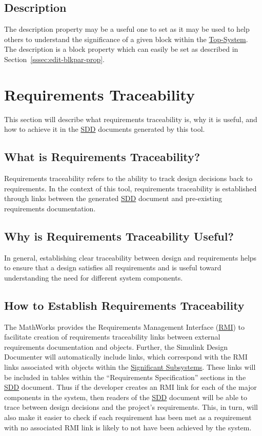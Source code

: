 \documentclass{mcscert}
\newcommand{\mathworks}{The MathWorks}
\newcommand{\sddtool}{Simulink Design Documenter}
\newcommand{\topsystemnolink}{Top-System} %
\newcommand{\topsystem}{\hyperref[def:topsystem]{\topsystemnolink{}}}
\newcommand{\sigsubsnolink}{Significant Subsystems} %
\newcommand{\sigsubs}{\hyperref[def:sigsubs]{\sigsubsnolink{}}}
\begin{document}
	\subsection{Description}
	\label{ssec:include-int-descr}
	The description property may be a useful one to set as it may be used to help others to understand the significance of a given block within the \topsystem{}. The description is a block property which can easily be set as described in Section~\ref{sssec:edit-blkpar-prop}.

\section{Requirements Traceability}
\label{sec:req-trace}
This section will describe what requirements traceability is, why it is useful, and how to achieve it in the \hyperref[acr:sdd]{SDD} documents generated by this tool. 
		
	\subsection{What is Requirements Traceability?}
	Requirements traceability refers to the ability to track design decisions back to requirements. 
	In the context of this tool, requirements traceability is established through links between the generated \hyperref[acr:sdd]{SDD} document and pre-existing requirements documentation.
	  
	\subsection{Why is Requirements Traceability Useful?}
	In general, establishing clear traceability between design and requirements helps to ensure that a design satisfies all requirements and is useful toward understanding the need for different system components.

	\subsection{How to Establish Requirements Traceability}
	\mathworks{} provides the Requirements Management Interface (\hyperref[acr:rmi]{RMI}) to facilitate creation of requirements traceability links between external requirements documentation and \simulink{} objects. 
	Further, the \sddtool{} will automatically include links, which correspond with the RMI links associated with objects within the \sigsubs{}. 
	These links will be included in tables within the ``Requirements Specification'' sections in the \hyperref[acr:sdd]{SDD} document. 
	Thus if the developer creates an RMI link for each of the major components in the system, then readers of the \hyperref[acr:sdd]{SDD} document will be able to trace between design decisions and the project's requirements. 
	This, in turn, will also make it easier to check if each requirement has been met as a requirement with no associated RMI link is likely to not have been achieved by the system.
      
\end{document}

